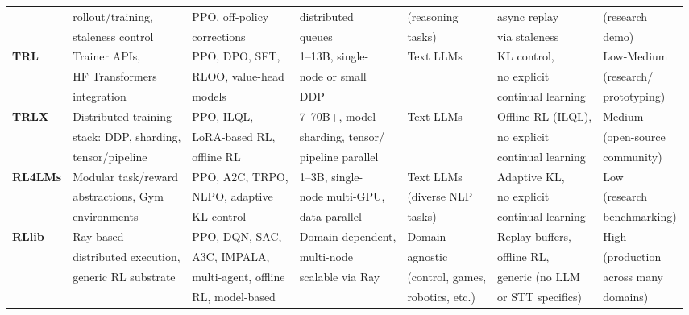 \documentclass[conference]{IEEEtran}
\begin{document}
\begin{table}[t]
{\begin{tabular}{@{}lllllll@{}}
 & rollout/training, & PPO, off-policy & distributed & (reasoning & async replay & (research \\
 & staleness control & corrections & queues & tasks) & via staleness & demo) \\
\midrule
\textbf{TRL} & Trainer APIs, & PPO, DPO, SFT, & 1–13B, single- & Text LLMs & KL control, & Low-Medium \\
 & HF Transformers & RLOO, value-head & node or small & & no explicit & (research/ \\
 & integration & models & DDP & & continual learning & prototyping) \\
\midrule
\textbf{TRLX} & Distributed training & PPO, ILQL, & 7–70B+, model & Text LLMs & Offline RL (ILQL), & Medium \\
 & stack: DDP, sharding, & LoRA-based RL, & sharding, tensor/ & & no explicit & (open-source \\
 & tensor/pipeline & offline RL & pipeline parallel & & continual learning & community) \\
\midrule
\textbf{RL4LMs} & Modular task/reward & PPO, A2C, TRPO, & 1–3B, single- & Text LLMs & Adaptive KL, & Low \\
 & abstractions, Gym & NLPO, adaptive & node multi-GPU, & (diverse NLP & no explicit & (research \\
 & environments & KL control & data parallel & tasks) & continual learning & benchmarking) \\
\midrule
\textbf{RLlib} & Ray-based & PPO, DQN, SAC, & Domain-dependent, & Domain- & Replay buffers, & High \\
 & distributed execution, & A3C, IMPALA, & multi-node & agnostic & offline RL, & (production \\
 & generic RL substrate & multi-agent, offline & scalable via Ray & (control, games, & generic (no LLM & across many \\
 & & RL, model-based & & robotics, etc.) & or STT specifics) & domains) \\
\bottomrule
\end{tabular}
}
\end{table}
\end{document}
